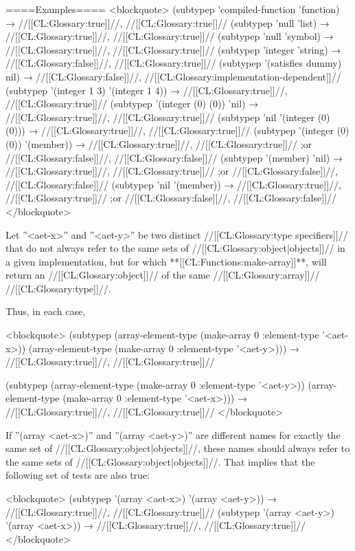 ====Examples====
<blockquote> (subtypep 'compiled-function 'function) → //[[CL:Glossary:true]]//, //[[CL:Glossary:true]]// (subtypep 'null 'list) → //[[CL:Glossary:true]]//, //[[CL:Glossary:true]]// (subtypep 'null 'symbol) → //[[CL:Glossary:true]]//, //[[CL:Glossary:true]]// (subtypep 'integer 'string) → //[[CL:Glossary:false]]//, //[[CL:Glossary:true]]// (subtypep '(satisfies dummy) nil) → //[[CL:Glossary:false]]//, //[[CL:Glossary:implementation-dependent]]// (subtypep '(integer 1 3) '(integer 1 4)) → //[[CL:Glossary:true]]//, //[[CL:Glossary:true]]// (subtypep '(integer (0) (0)) 'nil) → //[[CL:Glossary:true]]//, //[[CL:Glossary:true]]// (subtypep 'nil '(integer (0) (0))) → //[[CL:Glossary:true]]//, //[[CL:Glossary:true]]// (subtypep '(integer (0) (0)) '(member)) → //[[CL:Glossary:true]]//, //[[CL:Glossary:true]]// ;or //[[CL:Glossary:false]]//, //[[CL:Glossary:false]]// (subtypep '(member) 'nil) → //[[CL:Glossary:true]]//, //[[CL:Glossary:true]]// ;or //[[CL:Glossary:false]]//, //[[CL:Glossary:false]]// (subtypep 'nil '(member)) → //[[CL:Glossary:true]]//, //[[CL:Glossary:true]]// ;or //[[CL:Glossary:false]]//, //[[CL:Glossary:false]]// </blockquote>

Let ''<aet-x>'' and ''<aet-y>'' be two distinct //[[CL:Glossary:type specifiers]]// that do not always refer to the same sets of //[[CL:Glossary:object|objects]]// in a given implementation, but for which **[[CL:Functions:make-array]]**, will return an //[[CL:Glossary:object]]// of the same //[[CL:Glossary:array]]// //[[CL:Glossary:type]]//.

Thus, in each case,

<blockquote> (subtypep (array-element-type (make-array 0 :element-type '<aet-x>)) (array-element-type (make-array 0 :element-type '<aet-y>))) → //[[CL:Glossary:true]]//, //[[CL:Glossary:true]]//

(subtypep (array-element-type (make-array 0 :element-type '<aet-y>)) (array-element-type (make-array 0 :element-type '<aet-x>))) → //[[CL:Glossary:true]]//, //[[CL:Glossary:true]]// </blockquote>


If ''(array <aet-x>)'' and ''(array <aet-y>)'' are different names for exactly the same set of //[[CL:Glossary:object|objects]]//, these names should always refer to the same sets of //[[CL:Glossary:object|objects]]//. That implies that the following set of tests are also true:

<blockquote> (subtypep '(array <aet-x>) '(array <aet-y>)) → //[[CL:Glossary:true]]//, //[[CL:Glossary:true]]// (subtypep '(array <aet-y>) '(array <aet-x>)) → //[[CL:Glossary:true]]//, //[[CL:Glossary:true]]// </blockquote>

